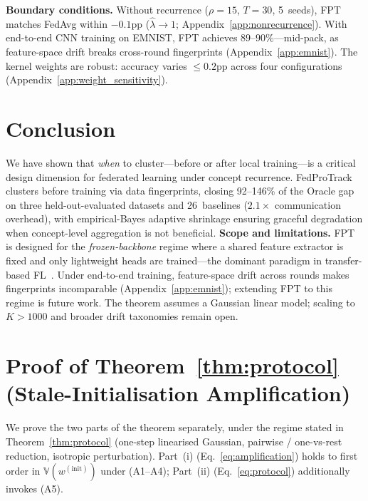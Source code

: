 \documentclass[11pt]{article}
\newcommand{\V}{\mathbb{V}}
\begin{document}
\textbf{Boundary conditions.}
Without recurrence ($\rho{=}15$, $T{=}30$, 5~seeds), FPT matches FedAvg within $-0.1$pp ($\hat\lambda \to 1$; Appendix~\ref{app:nonrecurrence}).
With end-to-end CNN training on EMNIST, FPT achieves $89$--$90\%$---mid-pack, as feature-space drift breaks cross-round fingerprints (Appendix~\ref{app:emnist}).
The kernel weights are robust: accuracy varies $\le 0.2$pp across four configurations (Appendix~\ref{app:weight_sensitivity}).


\section{Conclusion}
\label{sec:conclusion}

We have shown that \emph{when} to cluster---before or after local training---is a critical design dimension for federated learning under concept recurrence.
FedProTrack clusters before training via data fingerprints, closing 92--146\% of the Oracle gap on three held-out-evaluated datasets and 26~baselines ($2.1\times$ communication overhead), with empirical-Bayes adaptive shrinkage ensuring graceful degradation when concept-level aggregation is not beneficial.
\textbf{Scope and limitations.}
FPT is designed for the \emph{frozen-backbone} regime where a shared feature extractor is fixed and only lightweight heads are trained---the dominant paradigm in transfer-based FL~\citep{chen2022on, oh2022fedbabu}.
Under end-to-end training, feature-space drift across rounds makes fingerprints incomparable (Appendix~\ref{app:emnist}); extending FPT to this regime is future work.
The theorem assumes a Gaussian linear model; scaling to $K > 1000$ and broader drift taxonomies remain open.




\newpage
\appendix

\section{Proof of Theorem~\ref{thm:protocol} (Stale-Initialisation Amplification)}
\label{app:proof_protocol}

We prove the two parts of the theorem separately, under the regime stated in Theorem~\ref{thm:protocol} (one-step linearised Gaussian, pairwise / one-vs-rest reduction, isotropic perturbation). Part~(i) (Eq.~\ref{eq:amplification}) holds to first order in $\V(w^{(\mathrm{init})})$ under (A1--A4); Part~(ii) (Eq.~\ref{eq:protocol}) additionally invokes (A5).
\end{document}
